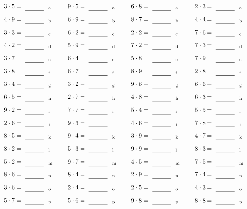 \documentclass
[
  draft    = true,
  fontsize = 11pt,
  parskip  = half-
]
{scrartcl}
\begin{document}
\par\vfill\par
\begin{align*}
    \pline{3\cdot5}&=\rline{a}
  & \pline{9\cdot5}&=\rline{a}
  & \pline{6\cdot8}&=\rline{a}
  & \pline{2\cdot3}&=\rline{a} \\[1ex]
    \pline{4\cdot9}&=\rline{b}
  & \pline{6\cdot9}&=\rline{b}
  & \pline{8\cdot7}&=\rline{b}
  & \pline{4\cdot4}&=\rline{b} \\[1ex]
    \pline{3\cdot3}&=\rline{c}
  & \pline{6\cdot2}&=\rline{c}
  & \pline{2\cdot2}&=\rline{c}
  & \pline{7\cdot6}&=\rline{c} \\[1ex]
    \pline{4\cdot2}&=\rline{d}
  & \pline{5\cdot9}&=\rline{d}
  & \pline{7\cdot2}&=\rline{d}
  & \pline{7\cdot3}&=\rline{d} \\[1ex]
    \pline{3\cdot7}&=\rline{e}
  & \pline{6\cdot4}&=\rline{e}
  & \pline{5\cdot8}&=\rline{e}
  & \pline{7\cdot9}&=\rline{e} \\[1ex]
    \pline{3\cdot8}&=\rline{f}
  & \pline{6\cdot7}&=\rline{f}
  & \pline{8\cdot9}&=\rline{f}
  & \pline{2\cdot8}&=\rline{f} \\[1ex]
    \pline{3\cdot4}&=\rline{g}
  & \pline{3\cdot2}&=\rline{g}
  & \pline{9\cdot6}&=\rline{g}
  & \pline{6\cdot6}&=\rline{g} \\[1ex]
    \pline{6\cdot5}&=\rline{h}
  & \pline{2\cdot7}&=\rline{h}
  & \pline{4\cdot8}&=\rline{h}
  & \pline{6\cdot3}&=\rline{h} \\[1ex]
    \pline{9\cdot2}&=\rline{i}
  & \pline{7\cdot7}&=\rline{i}
  & \pline{5\cdot4}&=\rline{i}
  & \pline{5\cdot5}&=\rline{i} \\[1ex]
    \pline{2\cdot6}&=\rline{j}
  & \pline{9\cdot3}&=\rline{j}
  & \pline{4\cdot6}&=\rline{j}
  & \pline{7\cdot8}&=\rline{j} \\[1ex]
    \pline{8\cdot5}&=\rline{k}
  & \pline{9\cdot4}&=\rline{k}
  & \pline{3\cdot9}&=\rline{k}
  & \pline{4\cdot7}&=\rline{k} \\[1ex]
    \pline{8\cdot2}&=\rline{l}
  & \pline{5\cdot3}&=\rline{l}
  & \pline{9\cdot9}&=\rline{l}
  & \pline{8\cdot3}&=\rline{l} \\[1ex]
    \pline{5\cdot2}&=\rline{m}
  & \pline{9\cdot7}&=\rline{m}
  & \pline{4\cdot5}&=\rline{m}
  & \pline{7\cdot5}&=\rline{m} \\[1ex]
    \pline{8\cdot6}&=\rline{n}
  & \pline{8\cdot4}&=\rline{n}
  & \pline{2\cdot9}&=\rline{n}
  & \pline{7\cdot4}&=\rline{n} \\[1ex]
    \pline{3\cdot6}&=\rline{o}
  & \pline{2\cdot4}&=\rline{o}
  & \pline{2\cdot5}&=\rline{o}
  & \pline{4\cdot3}&=\rline{o} \\[1ex]
    \pline{5\cdot7}&=\rline{p}
  & \pline{5\cdot6}&=\rline{p}
  & \pline{9\cdot8}&=\rline{p}
  & \pline{8\cdot8}&=\rline{p}
\end{align*}
\end{document}
